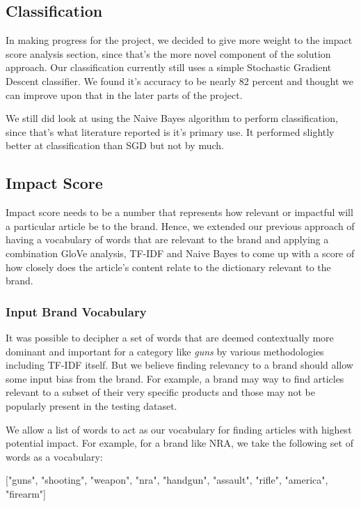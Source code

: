 \documentclass{article}
\begin{document}
\subsection {Classification}
In making progress for the project, we decided to give more weight to the impact score analysis section, since that's the more novel component of the solution approach. Our classification currently still uses a simple Stochastic Gradient Descent classifier. We found it's accuracy to be nearly 82 percent and thought we can improve upon that in the later parts of the project.

We still did look at using the Naive Bayes algorithm to perform classification, since that's what literature reported is it's primary use. It performed slightly better at classification than SGD but not by much.

\subsection {Impact Score}

Impact score needs to be a number that represents how relevant or impactful will a particular article be to the brand. Hence, we extended our previous approach of having a vocabulary of words that are relevant to the brand and applying a combination GloVe analysis, TF-IDF and Naive Bayes to come up with a score of how closely does the article's content relate to the dictionary relevant to the brand.

\subsubsection {Input Brand Vocabulary}
It was possible to decipher a set of words that are deemed contextually more dominant and important for a category like \textit{guns} by various methodologies including TF-IDF itself. But we believe finding relevancy to a brand should allow some input bias from the brand. For example, a brand may way to find articles relevant to a subset of their very specific products and those may not be popularly present in the testing dataset.

We allow a list of words to act as our vocabulary for finding articles with highest potential impact. For example, for a brand like NRA, we take the following set of words as a vocabulary:
\begin{center}
["guns", "shooting", "weapon", "nra", "handgun", "assault", "rifle", "america", "firearm"]
\end {center}
\end{document}
